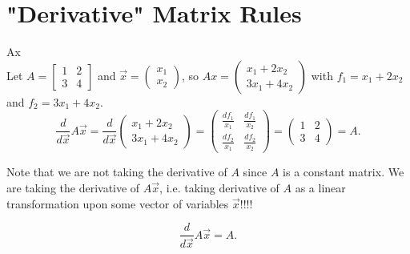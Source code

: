 \documentclass[a4paper]{article}
\begin{document}
\section{"Derivative" Matrix Rules}
\begin{note}{Ax}\\
  Let $A = \begin{bmatrix} 1 & 2 \\ 3 & 4 \end{bmatrix}$ and $\vec{x} = \begin{pmatrix} x_1\\ x_2 \end{pmatrix}$,
  so $Ax = \begin{pmatrix} x_1 + 2x_2 \\  3x_1 + 4x_2 \end{pmatrix}$ with $f_1 = x_1+2x_2$ and $f_2 =3x_1+4x_2$. 
  \[
    \frac{d}{d\vec{x}} A\vec{x} = \frac{d}{d \vec{x}} \begin{pmatrix} x_1 + 2x_2 \\  3x_1 + 4x_2 \end{pmatrix} = \begin{pmatrix} \frac{df_1}{x_1} & \frac{df_1}{x_2} \\ \frac{df_2}{x_1} & \frac{df_2}{x_2} \end{pmatrix} 
    = \begin{pmatrix}  1 & 2 \\ 3 & 4 \end{pmatrix} = A
  .\]
 \end{note}

 \begin{remark}
  Note that we are not taking the derivative of $A$ since  $A$ is a constant matrix. We are taking the derivative
  of  $A\vec{x}$, i.e. taking derivative of $A$ as a linear transformation upon some vector of variables $\vec{x}$!!!!
 \end{remark}
 
\begin{definition}
  \[
    \frac{d}{d\vec{x}} A \vec{x} = A
  .\] 
\end{definition}
\end{document}
